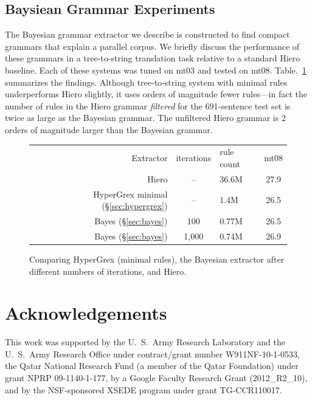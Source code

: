 \documentclass[nofonts]{pbml} %
\begin{document}
\subsection{Baysiean Grammar Experiments}
The Bayesian grammar extractor we describe is constructed to find compact grammars that explain a parallel corpus.
We briefly discuss the performance of these grammars in a tree-to-string translation task relative to a standard Hiero baseline.
Each of these systems was tuned on mt03 and tested on mt08.
Table.~\ref{bleuresults_worm} summarizes the findings.
Although tree-to-string system with minimal rules underperforms Hiero slightly, it uses orders of magnitude fewer rules---in fact
the number of rules in the Hiero grammar \emph{filtered} for the 691-sentence test set is twice as large as the Bayesian grammar. The unfiltered Hiero grammar is 2 orders of magnitude larger than the Bayesian grammar.

\begin{figure}[ht!]
\centering
\begin{tabular}{r c l c}
Extractor & iterations & rule count & mt08 \\
Hiero & -- & 36.6M & 27.9 \\
HyperGrex minimal (\S\ref{sec:hypergrex}) & -- & 1.4M & 26.5 \\
Bayes (\S\ref{sec:bayes}) & 100 & 0.77M & 26.5 \\
Bayes (\S\ref{sec:bayes}) & 1,000 & 0.74M & 26.9 \\
\end{tabular}
\caption{Comparing HyperGrex (minimal rules), the Bayesian extractor after different numbers of iterations, and Hiero.
\label{bleuresults_worm}}
\end{figure}

\section*{Acknowledgements}
This work was supported by the U.~S.~Army Research Laboratory and the U.~S.~Army Research Office under contract/grant number W911NF-10-1-0533, the Qatar National Research Fund (a member of the Qatar Foundation) under grant NPRP 09-1140-1-177, by a Google Faculty Research Grant (2012\_R2\_10), and by the NSF-sponsored XSEDE program under grant TG-CCR110017.



\correspondingaddress
\end{document}
